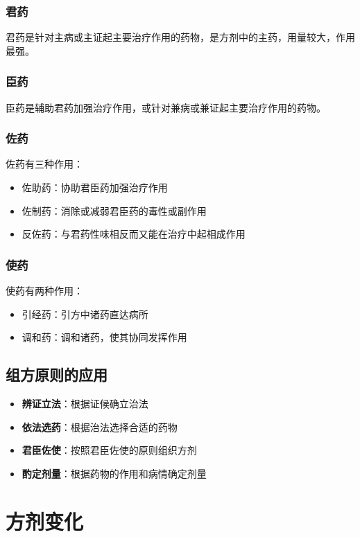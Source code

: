 \documentclass[12pt,UTF8]{ctexbook}
\begin{document}
\subsubsection{君药}

君药是针对主病或主证起主要治疗作用的药物，是方剂中的主药，用量较大，作用最强。

\subsubsection{臣药}

臣药是辅助君药加强治疗作用，或针对兼病或兼证起主要治疗作用的药物。

\subsubsection{佐药}

佐药有三种作用：
\begin{itemize}
\item 佐助药：协助君臣药加强治疗作用
\item 佐制药：消除或减弱君臣药的毒性或副作用
\item 反佐药：与君药性味相反而又能在治疗中起相成作用
\end{itemize}

\subsubsection{使药}

使药有两种作用：
\begin{itemize}
\item 引经药：引方中诸药直达病所
\item 调和药：调和诸药，使其协同发挥作用
\end{itemize}

\subsection{组方原则的应用}

\begin{itemize}
\item \textbf{辨证立法}：根据证候确立治法
\item \textbf{依法选药}：根据治法选择合适的药物
\item \textbf{君臣佐使}：按照君臣佐使的原则组织方剂
\item \textbf{酌定剂量}：根据药物的作用和病情确定剂量
\end{itemize}

\section{方剂变化}
\end{document}
